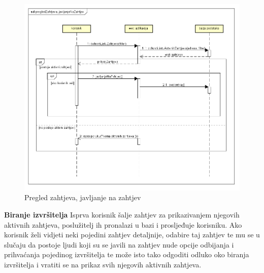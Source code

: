 				
				\begin{figure}[H]
					\includegraphics[scale=0.7]{slike/pregled-zahtjeva.png} %
					\centering
					\caption{Pregled zahtjeva, javljanje na zahtjev}
				\end{figure}
				\newpage
								
				\noindent \large {\textbf{Biranje izvršitelja}}
				\newline
				\noindent \normalsize Isprva korisnik šalje zahtjev za prikazivanjem njegovih aktivnih zahtjeva, poslužitelj ih pronalazi u bazi i prosljeđuje korisniku. Ako korisnik želi vidjeti neki pojedini zahtjev detaljnije, odabire taj zahtjev te mu se u slučaju da postoje ljudi koji su se javili na zahtjev nude opcije odbijanja i prihvaćanja pojedinog izvršitelja te može isto tako odgoditi odluko oko biranja izvršitelja i vratiti se na prikaz svih njegovih aktivnih zahtjeva. 
				   
